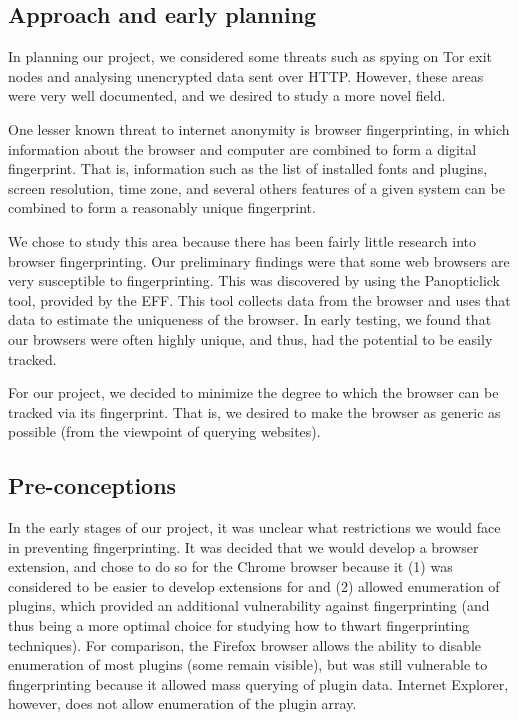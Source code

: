 \documentclass[12pt,a4paper]{article}
\begin{document}
\subsection{Approach and early planning}
In planning our project, we considered some threats such as spying on Tor exit nodes and analysing unencrypted data sent over HTTP. However, these areas were very well documented, and we desired to study a more novel field.

One lesser known threat to internet anonymity is browser fingerprinting, in which information about the browser and computer are combined to form a digital fingerprint. That is, information such as the list of installed fonts and plugins, screen resolution, time zone, and several others features of a given system can be combined to form a reasonably unique fingerprint.

We chose to study this area because there has been fairly little research into browser fingerprinting. Our preliminary findings were that some web browsers are very susceptible to fingerprinting. This was discovered by using the Panopticlick\cite{panopticlick} tool, provided by the EFF. This tool collects data from the browser and uses that data to estimate the uniqueness of the browser. In early testing, we found that our browsers were often highly unique, and thus, had the potential to be easily tracked.

For our project, we decided to minimize the degree to which the browser can be tracked via its fingerprint. That is, we desired to make the browser as generic as possible (from the viewpoint of querying websites).

\subsection{Pre-conceptions}
In the early stages of our project, it was unclear what restrictions we would face in preventing fingerprinting. It was decided that we would develop a browser extension, and chose to do so for the Chrome browser because it (1) was considered to be easier to develop extensions for and (2) allowed enumeration of plugins, which provided an additional vulnerability against fingerprinting (and thus being a more optimal choice for studying how to thwart fingerprinting techniques). For comparison, the Firefox browser allows the ability to disable enumeration of most plugins (some remain visible), but was still vulnerable to fingerprinting because it allowed mass querying of plugin data. Internet Explorer, however, does not allow enumeration of the plugin array.
\end{document}
